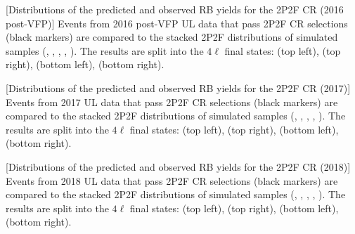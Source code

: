\begin{multiFigure}
	\centering
		[Distributions of the predicted and observed RB yields for the 2P2F CR (2016 post-VFP)]
		{Events from 2016 post-VFP UL data that pass 2P2F CR selections (black markers) 
		are compared to the stacked 2P2F distributions of simulated samples
		(\Zplusjets, \ttbarplusjets, \WZ, \ZZ, \Zgammastar).
		The results are split into the $4\ell$ final states:
		\fourmu (top left), \foure (top right), \twoetwomu (bottom left), \twomutwoe (bottom right).}
	\label{cr_plots_2p2f_2016postvfp}
\end{multiFigure}
\begin{multiFigure}
	\centering
		[Distributions of the predicted and observed RB yields for the 2P2F CR (2017)]
		{Events from 2017 UL data that pass 2P2F CR selections (black markers) 
		are compared to the stacked 2P2F distributions of simulated samples
		(\Zplusjets, \ttbarplusjets, \WZ, \ZZ, \Zgammastar).
		The results are split into the $4\ell$ final states:
		\fourmu (top left), \foure (top right), \twoetwomu (bottom left), \twomutwoe (bottom right).}
	\label{cr_plots_2p2f_2017}
\end{multiFigure}
\begin{multiFigure}
		[Distributions of the predicted and observed RB yields for the 2P2F CR (2018)]
		{Events from 2018 UL data that pass 2P2F CR selections (black markers) 
		are compared to the stacked 2P2F distributions of simulated samples
		(\Zplusjets, \ttbarplusjets, \WZ, \ZZ, \Zgammastar).
		The results are split into the $4\ell$ final states:
		\fourmu (top left), \foure (top right), \twoetwomu (bottom left), \twomutwoe (bottom right).}
	\label{cr_plots_2p2f_2018}
\end{multiFigure}
